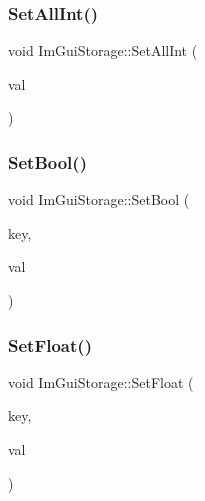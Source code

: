 \mbox{\label{struct_im_gui_storage_ae5ee60618c4ce8e2b4ce0e5543d52992}} 
\subsubsection{\texorpdfstring{Set\+All\+Int()}{SetAllInt()}}
{\footnotesize\ttfamily void Im\+Gui\+Storage\+::\+Set\+All\+Int (\begin{DoxyParamCaption}\item[{int}]{val }\end{DoxyParamCaption})}

\mbox{\label{struct_im_gui_storage_ac5beee31a59b3f5294b41992717be7bf}} 
\subsubsection{\texorpdfstring{Set\+Bool()}{SetBool()}}
{\footnotesize\ttfamily void Im\+Gui\+Storage\+::\+Set\+Bool (\begin{DoxyParamCaption}\item[{\mbox{\hyperlink{imgui_8h_a1785c9b6f4e16406764a85f32582236f}{Im\+Gui\+ID}}}]{key,  }\item[{bool}]{val }\end{DoxyParamCaption})}

\mbox{\label{struct_im_gui_storage_ab531d90a0e5a1a2453e351c499149756}} 
\subsubsection{\texorpdfstring{Set\+Float()}{SetFloat()}}
{\footnotesize\ttfamily void Im\+Gui\+Storage\+::\+Set\+Float (\begin{DoxyParamCaption}\item[{\mbox{\hyperlink{imgui_8h_a1785c9b6f4e16406764a85f32582236f}{Im\+Gui\+ID}}}]{key,  }\item[{float}]{val }\end{DoxyParamCaption})}


